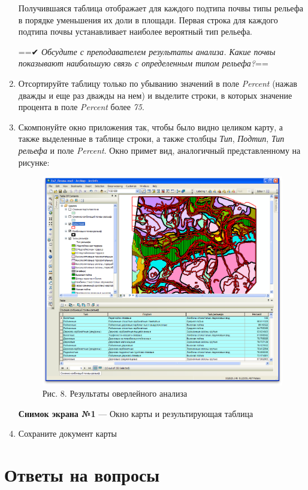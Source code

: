 \documentclass[]{book}
\theoremstyle{definition}
\theoremstyle{definition}
\theoremstyle{definition}
\theoremstyle{remark}
\begin{document}
\begin{enumerate}
  Получившаяся таблица отображает для каждого подтипа почвы типы рельефа
  в порядке уменьшения их доли в площади. Первая строка для каждого
  подтипа почвы устанавливает наиболее вероятный тип рельефа.

  ==✔︎ \emph{Обсудите с преподавателем результаты анализа. Какие почвы
  показывают наибольшую связь с определенным типом рельефа?}==
\item
  Отсортируйте таблицу только по убыванию значений в поле \emph{Percent}
  (нажав дважды и еще раз дважды на нем) и выделите строки, в которых
  значение процента в поле \emph{Percent} более \emph{75}.
\item
  Скомпонуйте окно приложения так, чтобы было видно целиком карту, а
  также выделенные в таблице строки, а также столбцы \emph{Тип},
  \emph{Подтип}, \emph{Тип рельефа} и поле \emph{Percent}. Окно примет
  вид, аналогичный представленному на рисунке:

  \begin{figure}
  \centering
  \includegraphics{images/Ex10/image13.png}
  \caption{Рис. 8. Результаты оверлейного анализа}
  \end{figure}

  \textbf{Снимок экрана №1} --- Окно карты и результирующая таблица
\item
  Сохраните документ карты
\end{enumerate}

\hypertarget{overlay-questions}{%
\section{Ответы на вопросы}\label{overlay-questions}}
\end{document}

